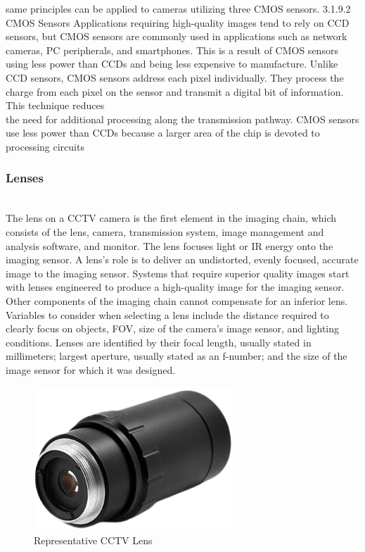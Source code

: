 \documentclass[12pt,fleqn]{book} %
\begin{document}
\begin{enumerate}
same principles can be applied to cameras utilizing three CMOS sensors. 3.1.9.2 CMOS Sensors Applications requiring high-quality images tend to rely on CCD sensors, but CMOS sensors are commonly used in applications such as network cameras, PC peripherals, and smartphones. This is a result of CMOS sensors using less power than CCDs and being less expensive to manufacture. Unlike CCD sensors, CMOS sensors address each pixel individually. They process the charge from each pixel on the sensor and transmit a digital bit of information. This technique reduces
    \\ the need for additional processing along the transmission pathway. CMOS sensors use less power than CCDs because a larger area of the chip is devoted to processing circuits
\end{enumerate}
\subsubsection{Lenses}
\\ The lens on a CCTV camera is the first element in the imaging chain, which consists of the lens, camera, transmission system, image management and analysis software, and monitor. The lens focuses light or IR energy onto the imaging sensor. A lens’s role is to deliver an undistorted, evenly focused, accurate image to the imaging sensor. Systems that require superior quality images start with lenses engineered to produce a high-quality image for the imaging sensor. Other components of the imaging chain cannot compensate for an inferior lens. Variables to consider when selecting a lens include the distance required to clearly focus on objects, FOV, size of the camera’s image sensor, and lighting conditions. Lenses are identified by their focal length, usually stated in millimeters; largest aperture, usually stated as an f-number; and the size of the image sensor for which it was designed.
\begin{figure}[!h]
    \centering
    \includegraphics[width=0.5\linewidth]{c 6.png}
    \caption{Representative CCTV Lens}
    \label{fig:c 6}
    \end{figure}
\end{document}
